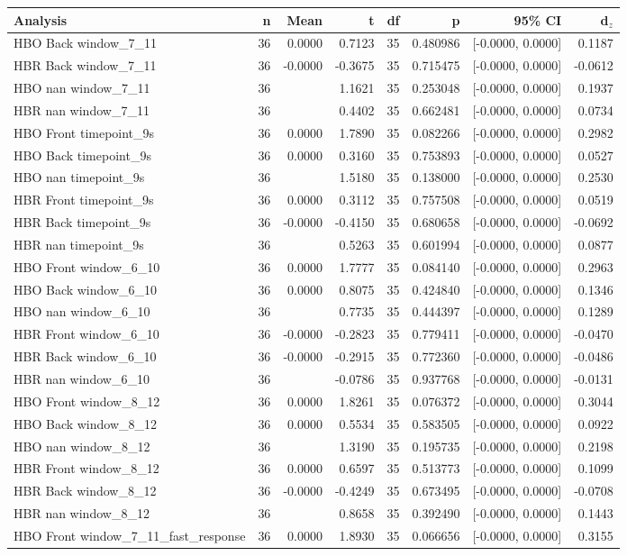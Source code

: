 \begin{tabular}{lrrrrrrr}
\toprule
Analysis & n & Mean & t & df & p & 95\% CI & d$_z$\\
\midrule
HBO Back window\_7\_11 & 36 & 0.0000 & 0.7123 & 35 & 0.480986 & [-0.0000, 0.0000] & 0.1187\\
HBR Back window\_7\_11 & 36 & -0.0000 & -0.3675 & 35 & 0.715475 & [-0.0000, 0.0000] & -0.0612\\
HBO nan window\_7\_11 & 36 &  & 1.1621 & 35 & 0.253048 & [-0.0000, 0.0000] & 0.1937\\
HBR nan window\_7\_11 & 36 &  & 0.4402 & 35 & 0.662481 & [-0.0000, 0.0000] & 0.0734\\
HBO Front timepoint\_9s & 36 & 0.0000 & 1.7890 & 35 & 0.082266 & [-0.0000, 0.0000] & 0.2982\\
HBO Back timepoint\_9s & 36 & 0.0000 & 0.3160 & 35 & 0.753893 & [-0.0000, 0.0000] & 0.0527\\
HBO nan timepoint\_9s & 36 &  & 1.5180 & 35 & 0.138000 & [-0.0000, 0.0000] & 0.2530\\
HBR Front timepoint\_9s & 36 & 0.0000 & 0.3112 & 35 & 0.757508 & [-0.0000, 0.0000] & 0.0519\\
HBR Back timepoint\_9s & 36 & -0.0000 & -0.4150 & 35 & 0.680658 & [-0.0000, 0.0000] & -0.0692\\
HBR nan timepoint\_9s & 36 &  & 0.5263 & 35 & 0.601994 & [-0.0000, 0.0000] & 0.0877\\
HBO Front window\_6\_10 & 36 & 0.0000 & 1.7777 & 35 & 0.084140 & [-0.0000, 0.0000] & 0.2963\\
HBO Back window\_6\_10 & 36 & 0.0000 & 0.8075 & 35 & 0.424840 & [-0.0000, 0.0000] & 0.1346\\
HBO nan window\_6\_10 & 36 &  & 0.7735 & 35 & 0.444397 & [-0.0000, 0.0000] & 0.1289\\
HBR Front window\_6\_10 & 36 & -0.0000 & -0.2823 & 35 & 0.779411 & [-0.0000, 0.0000] & -0.0470\\
HBR Back window\_6\_10 & 36 & -0.0000 & -0.2915 & 35 & 0.772360 & [-0.0000, 0.0000] & -0.0486\\
HBR nan window\_6\_10 & 36 &  & -0.0786 & 35 & 0.937768 & [-0.0000, 0.0000] & -0.0131\\
HBO Front window\_8\_12 & 36 & 0.0000 & 1.8261 & 35 & 0.076372 & [-0.0000, 0.0000] & 0.3044\\
HBO Back window\_8\_12 & 36 & 0.0000 & 0.5534 & 35 & 0.583505 & [-0.0000, 0.0000] & 0.0922\\
HBO nan window\_8\_12 & 36 &  & 1.3190 & 35 & 0.195735 & [-0.0000, 0.0000] & 0.2198\\
HBR Front window\_8\_12 & 36 & 0.0000 & 0.6597 & 35 & 0.513773 & [-0.0000, 0.0000] & 0.1099\\
HBR Back window\_8\_12 & 36 & -0.0000 & -0.4249 & 35 & 0.673495 & [-0.0000, 0.0000] & -0.0708\\
HBR nan window\_8\_12 & 36 &  & 0.8658 & 35 & 0.392490 & [-0.0000, 0.0000] & 0.1443\\
HBO Front window\_7\_11\_fast\_response & 36 & 0.0000 & 1.8930 & 35 & 0.066656 & [-0.0000, 0.0000] & 0.3155\\
\bottomrule
\end{tabular}
